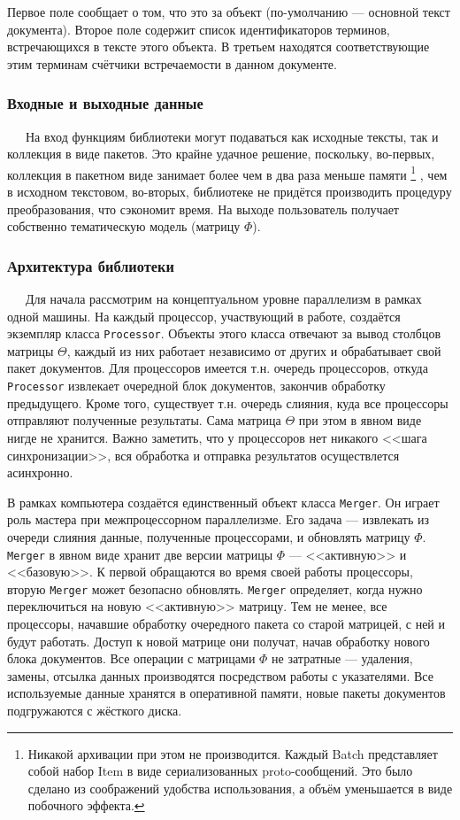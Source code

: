  Первое поле сообщает о том, что это за объект (по-умолчанию --- основной текст документа). Второе поле содержит список идентификаторов терминов, встречающихся в тексте этого объекта. В третьем находятся соответствующие этим терминам счётчики встречаемости в данном документе.

\subsubsection{Входные и выходные данные}
$\quad\;\:$На вход функциям библиотеки могут подаваться как исходные тексты, так и коллекция в виде пакетов. Это крайне удачное решение, поскольку, во-первых, коллекция в пакетном виде занимает более чем в два раза меньше памяти
\footnote{Никакой архивации при этом не производится. Каждый Batch представляет собой набор Item в виде сериализованных proto-сообщений. Это было сделано из соображений удобства использования, а объём уменьшается в виде побочного эффекта.}
, чем в исходном текстовом, во-вторых, библиотеке не придётся производить процедуру преобразования, что сэкономит время. 
На выходе пользователь получает собственно тематическую модель (матрицу $\Phi$).

\subsubsection{Архитектура библиотеки} 
$\quad\;\:$Для начала рассмотрим на концептуальном уровне параллелизм в рамках одной машины. На каждый процессор, участвующий в работе, создаётся экземпляр класса \verb|Processor|. Объекты этого класса отвечают за вывод столбцов матрицы $\Theta$, каждый из них работает независимо от других и обрабатывает свой пакет документов. Для процессоров имеется т.н. очередь процессоров, откуда \verb|Processor| извлекает очередной блок документов, закончив обработку предыдущего. Кроме того, существует т.н. очередь слияния, куда все процессоры отправляют полученные результаты. Сама матрица $\Theta$ при этом в явном виде нигде не хранится. Важно заметить, что у процессоров нет никакого <<шага синхронизации>>, вся обработка и отправка результатов осуществлется асинхронно.

В рамках компьютера создаётся единственный объект класса \verb|Merger|. Он играет роль мастера при межпроцессорном параллелизме. Его задача --- извлекать из очереди слияния данные, полученные процессорами, и обновлять матрицу $\Phi$. \verb|Merger| в явном виде хранит две версии матрицы $\Phi$ --- <<активную>> и <<базовую>>. К первой обращаются во время своей работы процессоры, вторую \verb|Merger| может безопасно обновлять. \verb|Merger| определяет, когда нужно переключиться на новую <<активную>> матрицу. Тем не менее, все процессоры, начавшие обработку очередного пакета со старой матрицей, с ней и будут работать. Доступ к новой матрице они получат, начав обработку нового блока документов. Все операции с матрицами $\Phi$ не затратные --- удаления, замены, отсылка данных производятся посредством работы с указателями. Все используемые данные хранятся в оперативной памяти, новые пакеты документов подгружаются с жёсткого диска.

